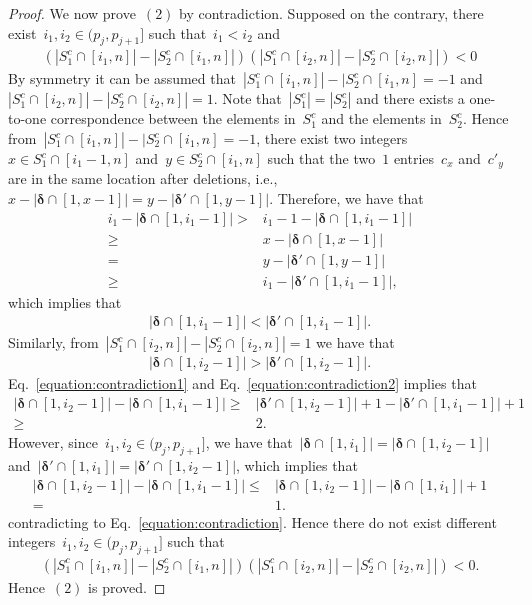 \documentclass[10pt,a4paper,onecolumn]{IEEEtran}
\newcommand{\1}{\mathbbold{1}}
\begin{document}
\begin{proof}
We now prove~$(2)$ by contradiction. Supposed on the contrary, there exist~$i_1,i_2\in (p_j,p_{j+1}]$ such that~$i_1<i_2$ and
\begin{align*}
    (|S^c_1\cap[i_1,n]|-|S^c_2\cap[i_1,n]|)(|S^c_1\cap[i_2,n]|-|S^c_2\cap[i_2,n]|)<0
\end{align*}
By symmetry it can be assumed that~$|S^c_1\cap[i_1,n]|-|S^c_2\cap[i_1,n]=-1$ and~$|S^c_1\cap[i_2,n]|-|S^c_2\cap[i_2,n]|=1$. Note that~$|S^c_1|=|S^c_2|$ and there exists a one-to-one correspondence between the elements in~$S^c_1$ and the elements in~$S^c_2$. Hence from~$|S^c_1\cap[i_1,n]|-|S^c_2\cap[i_1,n]=-1$, there exist two integers~$x\in S^c_1\cap[i_1-1,n]$
and~$y\in S^c_2\cap[i_1,n]$ such that the two~$1$ entries~$c_x$ and~$c'_y$ are in the same location after deletions, i.e.,~$x-|\boldsymbol{\delta}\cap[1,x-1]|=y-|\boldsymbol{\delta}'\cap[1,y-1]|$. Therefore, we have that
\begin{align*}
    i_1-|\boldsymbol{\delta}\cap[1,i_1-1]|>&i_1-1-|\boldsymbol{\delta}\cap[1,i_1-1]|\\
    \ge&x-|\boldsymbol{\delta}\cap[1,x-1]|\\
    =&y-|\boldsymbol{\delta}'\cap[1,y-1]|\\
    \ge& i_1-|\boldsymbol{\delta}'\cap[1,i_1-1]|,
\end{align*}
which implies that
\begin{align}\label{equation:contradiction1}
    |\boldsymbol{\delta}\cap[1,i_1-1]|<|\boldsymbol{\delta}'\cap[1,i_1-1]|.
\end{align}
 Similarly, from~$|S^c_1\cap[i_2,n]|-|S^c_2\cap[i_2,n]|=1$ we have that
\begin{align}\label{equation:contradiction2}
|\boldsymbol{\delta}\cap[1,i_2-1]|>|\boldsymbol{\delta}'\cap[1,i_2-1]| .   
\end{align}
Eq.~\eqref{equation:contradiction1} and Eq.~\eqref{equation:contradiction2} implies that
\begin{align}\label{equation:contradiction}
|\boldsymbol{\delta}\cap[1,i_2-1]|-|\boldsymbol{\delta}\cap[1,i_1-1]|\ge &
|\boldsymbol{\delta}'\cap[1,i_2-1]|+1-|\boldsymbol{\delta}'\cap[1,i_1-1]|+1\nonumber\\
\ge & 2.
\end{align}
However, since~$i_1,i_2\in (p_j,p_{j+1}]$, we have that~$|\boldsymbol{\delta}\cap[1,i_1]|=|\boldsymbol{\delta}\cap[1,i_2-1]|$ and~$|\boldsymbol{\delta}'\cap[1,i_1]|=|\boldsymbol{\delta}'\cap[1,i_2-1]|$,
which implies that
\begin{align*}
   |\boldsymbol{\delta}\cap[1,i_2-1]|-|\boldsymbol{\delta}\cap[1,i_1-1]|\le
   &|\boldsymbol{\delta}\cap[1,i_2-1]|-|\boldsymbol{\delta}\cap[1,i_1]|+1\\
   =&1.
\end{align*}
contradicting to Eq.~\eqref{equation:contradiction}. Hence there do not exist different integers~$i_1,i_2\in (p_j,p_{j+1}]$ such that
\begin{align*}
    (|S^c_1\cap[i_1,n]|-|S^c_2\cap[i_1,n]|)(|S^c_1\cap[i_2,n]|-|S^c_2\cap[i_2,n]|)<0.
\end{align*}
Hence~$(2)$ is proved.


\end{proof}
\end{document}
